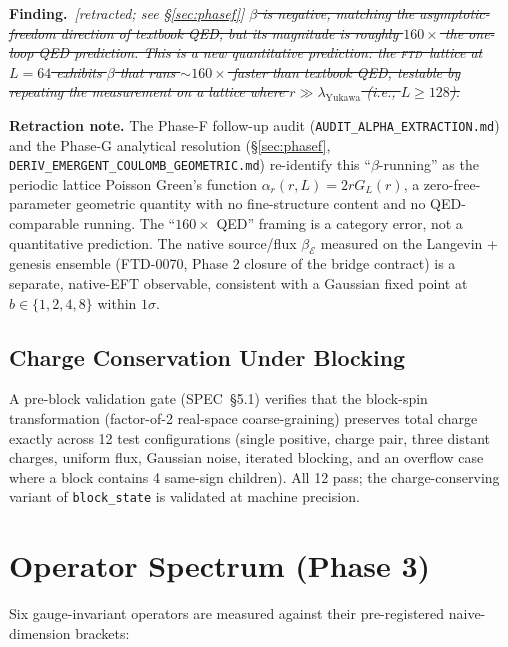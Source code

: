 \documentclass[11pt,letterpaper]{article}
\newcommand{\FTD}{\textsc{ftd}}
\newenvironment{finding}{\par\medskip\noindent\textbf{Finding.}\itshape\ }{\par\medskip}
\begin{document}
\begin{finding}[retracted; see \S\ref{sec:phasef}]
\sout{$\beta$ is negative, matching the asymptotic-freedom direction of
textbook QED, but its magnitude is roughly $160\times$ the
one-loop QED prediction. This is a new quantitative prediction:
the \FTD\ lattice at $L = 64$ exhibits $\beta$ that runs $\sim\!160\times$
faster than textbook QED, testable by repeating the measurement on
a lattice where $r \gg \lambda_{\mathrm{Yukawa}}$ (i.e., $L \geq 128$).}

\textbf{Retraction note.} The Phase-F follow-up audit
(\texttt{AUDIT\_ALPHA\_EXTRACTION.md}) and the Phase-G analytical
resolution (\S\ref{sec:phasef},
\texttt{DERIV\_EMERGENT\_COULOMB\_GEOMETRIC.md}) re-identify this
``$\beta$-running'' as the periodic lattice Poisson Green's function
$\alpha_r(r, L) = 2 r G_L(r)$, a zero-free-parameter geometric quantity
with no fine-structure content and no QED-comparable running. The
``$160\times$ QED'' framing is a category error, not a quantitative
prediction. The native source/flux $\beta_{\mathcal{E}}$ measured on
the Langevin + genesis ensemble (FTD-0070, Phase 2 closure of the
bridge contract) is a separate, native-EFT observable, consistent with
a Gaussian fixed point at $b \in \{1, 2, 4, 8\}$ within $1\sigma$.
\end{finding}

\subsection{Charge Conservation Under Blocking}

A pre-block validation gate (SPEC~\S5.1) verifies that the block-spin
transformation (factor-of-2 real-space coarse-graining) preserves total
charge exactly across 12 test configurations (single positive, charge
pair, three distant charges, uniform flux, Gaussian noise, iterated
blocking, and an overflow case where a block contains 4 same-sign
children). All 12 pass; the charge-conserving variant of
\texttt{block\_state} is validated at machine precision.

\section{Operator Spectrum (Phase 3)}
\label{sec:operators}

Six gauge-invariant operators are measured against their pre-registered
naive-dimension brackets:
\end{document}
